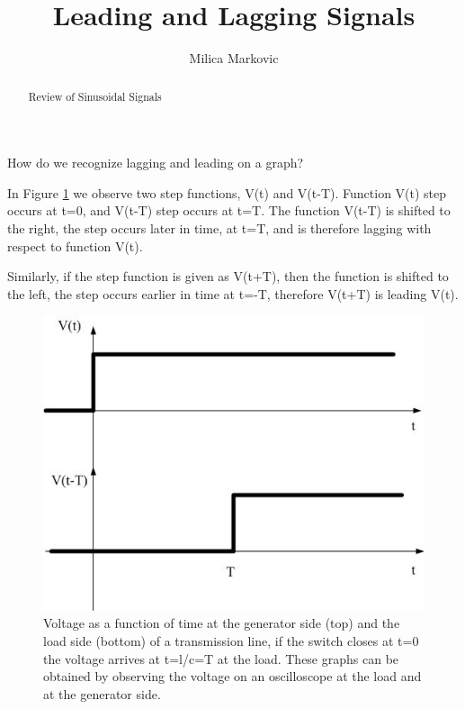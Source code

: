 \documentclass{ximera}
\title{Leading and Lagging Signals}
\author{Milica Markovic}
\begin{document}
  
\begin{abstract}  
Review of Sinusoidal Signals
\end{abstract}  
\maketitle


\begin{definition}
How do we recognize lagging and leading on a graph? 

In Figure \ref{timedelaysig} we observe two step functions, V(t) and V(t-T). Function V(t) step occurs at t=0, and V(t-T) step occurs at t=T. The function V(t-T) is shifted to the right, the step occurs later in time, at t=T, and is therefore lagging with respect to function V(t). 


Similarly, if the step function is given as V(t+T), then the function is shifted to the left, the step occurs earlier in time at t=-T, therefore V(t+T) is leading V(t).


\begin{figure}[htbp]
\begin{center}
\includegraphics[scale=0.5]{jpg/timedelayedsignal.jpg}  
\end{center}
\caption{Voltage as a function of time at the generator side (top) and the load side (bottom) of a transmission line, if the switch closes at t=0 the voltage arrives at t=l/c=T at the load. These graphs can be obtained by observing the voltage on an oscilloscope at the load and at the generator side.}
\label{timedelaysig} 
 \end{figure}
\end{definition}
\end{document}
